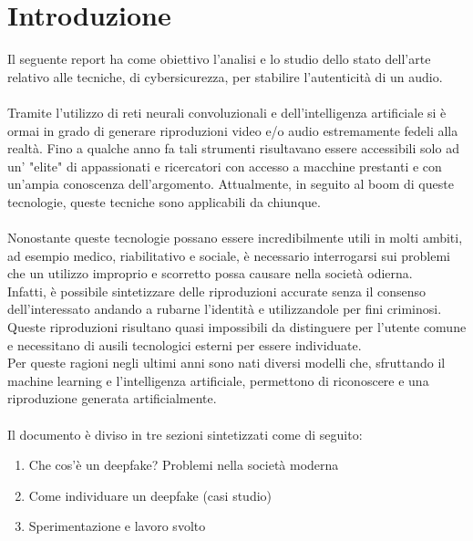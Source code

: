 \documentclass[12pt, a4paper]{article}
\begin{document}


\newpage

\section{Introduzione}
Il seguente report ha come obiettivo l'analisi e lo studio dello stato dell'arte relativo alle tecniche, di cybersicurezza, per stabilire l'autenticità di un audio. \\\\
Tramite l'utilizzo di reti neurali convoluzionali e dell'intelligenza artificiale si è ormai in grado di generare riproduzioni video e/o audio estremamente fedeli alla realtà. Fino a qualche anno fa tali strumenti risultavano essere accessibili solo ad un' "elite" di appassionati e ricercatori con accesso a macchine prestanti e con un'ampia conoscenza dell'argomento. Attualmente, in seguito al boom di queste tecnologie, queste tecniche sono applicabili da chiunque.
\\\\
Nonostante queste tecnologie possano essere incredibilmente utili in molti ambiti, ad esempio medico, riabilitativo e sociale, è necessario interrogarsi sui problemi che un utilizzo improprio e scorretto possa causare nella società odierna.\\
Infatti, è possibile sintetizzare delle riproduzioni accurate senza il consenso dell'interessato andando a rubarne l'identità e utilizzandole per fini criminosi.
Queste riproduzioni risultano quasi impossibili da distinguere per l'utente comune e necessitano di ausili tecnologici esterni per essere individuate. \\
Per queste ragioni negli ultimi anni sono nati diversi modelli che, sfruttando il machine learning e l'intelligenza artificiale, permettono di riconoscere e una riproduzione generata artificialmente. 
\\\\
Il documento è diviso in tre sezioni sintetizzati come di seguito: 
\begin{enumerate}
    \item Che cos'è un deepfake? Problemi nella società moderna
    \item Come individuare un deepfake (casi studio)
    \item Sperimentazione e lavoro svolto
\end{enumerate}


\end{document}
